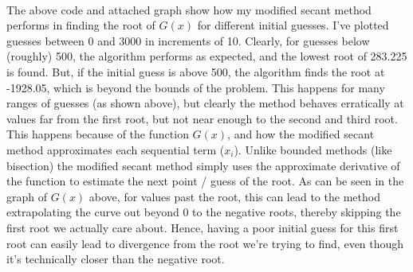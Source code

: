 \documentclass[11pt]{article}
\begin{document}
    \begin{center}
    \end{center}
    { \hspace*{\fill} \\}
    
    The above code and attached graph show how my modified secant method
performs in finding the root of \(G(x)\) for different initial guesses.
I've plotted guesses between 0 and 3000 in increments of 10. Clearly,
for guesses below (roughly) 500, the algorithm performs as expected, and
the lowest root of 283.225 is found. But, if the initial guess is above
500, the algorithm finds the root at -1928.05, which is beyond the
bounds of the problem. This happens for many ranges of guesses (as shown
above), but clearly the method behaves erratically at values far from
the first root, but not near enough to the second and third root. This
happens because of the function \(G(x)\), and how the modified secant
method approximates each sequential term (\(x_i\)). Unlike bounded
methods (like bisection) the modified secant method simply uses the
approximate derivative of the function to estimate the next point /
guess of the root. As can be seen in the graph of \(G(x)\) above, for
values past the root, this can lead to the method extrapolating the
curve out beyond 0 to the negative roots, thereby skipping the first
root we actually care about. Hence, having a poor initial guess for this
first root can easily lead to divergence from the root we're trying to
find, even though it's technically closer than the negative root.


    
    
    
    
\end{document}
